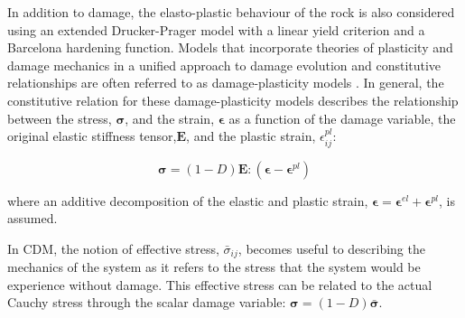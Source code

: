 In addition to damage, the elasto-plastic behaviour of the rock is also considered using an extended Drucker-Prager model with a linear yield criterion and a Barcelona hardening function. Models that incorporate theories of plasticity and damage mechanics in a unified approach to damage evolution and constitutive relationships are often referred to as damage-plasticity models \citep{zhang_continuum_2010}. In general, the constitutive relation for these damage-plasticity models describes the relationship between the stress, $\boldsymbol{\sigma}$, and the strain, $\boldsymbol{\epsilon}$ as a function of the damage variable, the original elastic stiffness tensor,$\mathbf{E}$, and the plastic strain, $\epsilon^{pl}_{ij}$: 

\begin{equation}
\boldsymbol{\sigma}=\left(1-D\right)\mathbf{E}:\left(\boldsymbol{\epsilon}-\boldsymbol{\epsilon}^{pl}\right)
\label{eqn:const5}
\end{equation}

where an additive decomposition of the elastic and plastic strain, $\boldsymbol{\epsilon}=\boldsymbol{\epsilon}^{el}+\boldsymbol{\epsilon}^{pl}$, is assumed.

In CDM, the notion of effective stress, $\bar{\sigma}_{ij}$, becomes useful to describing the mechanics of the system as it refers to the stress that the system would be experience without damage. This effective stress can be related to the actual Cauchy stress through the scalar damage variable: $\boldsymbol{\sigma}=\left(1-D\right)\bar{\boldsymbol{\sigma}}$.
